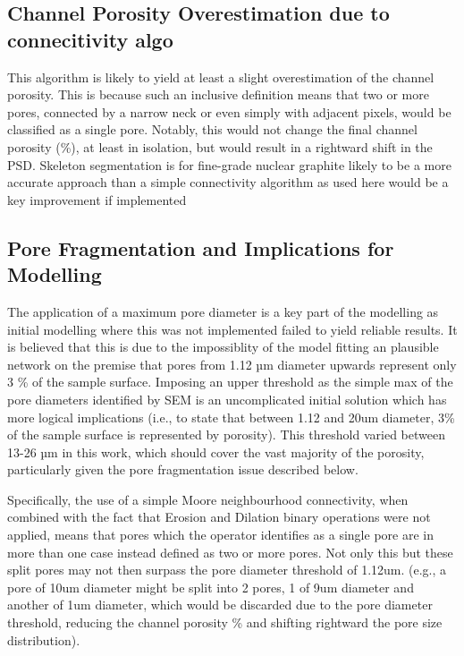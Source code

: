 \documentclass[review]{elsarticle}
\begin{document}
  \subsection{Channel Porosity Overestimation due to connecitivity algo}
  This algorithm is likely to yield at least a  slight overestimation of the
channel porosity. This is because such an inclusive definition means that two or
more pores, connected by a narrow neck or even simply with adjacent pixels,
would be classified as a single pore. Notably, this would not change the final
channel porosity (\%), at least in isolation, but would result in a rightward
shift in the PSD. Skeleton segmentation is for fine-grade nuclear graphite
likely to be a more accurate approach than a simple connectivity algorithm as
used here would be a key improvement if implemented
\cite{ARREGUIMENA2022112047}

\subsection{Pore Fragmentation and Implications for Modelling}
The application of a maximum pore diameter is a key part of the modelling as
  initial modelling where this was not implemented failed to yield reliable
  results. It is believed that this is due to the impossiblity of the model
  fitting an plausible network on the premise that pores from 1.12 µm diameter
  upwards represent only 3 \% of the sample surface. Imposing an upper threshold
  as the simple max of the pore diameters identified by SEM is an uncomplicated
  initial solution which has more logical implications (i.e., to state that
  between 1.12 and 20um diameter, 3\% of the sample surface is represented by
  porosity). This threshold varied between 13-26 µm in this work, which should
  cover the vast majority of the porosity, particularly given the pore fragmentation
  issue described below.

  Specifically, the use of a simple Moore neighbourhood connectivity, when
  combined with the fact that Erosion and Dilation binary operations were not
  applied, means that pores which the operator identifies as a single pore are
  in more than one case instead defined as two or more pores. Not only this but
  these split pores may not then surpass the pore diameter threshold of 1.12um.
  (e.g., a pore of 10um diameter might be split into 2 pores, 1 of 9um diameter
  and another of 1um diameter, which would be discarded due to the pore diameter
  threshold, reducing the channel porosity \% and shifting rightward the pore
  size distribution).
\end{document}
